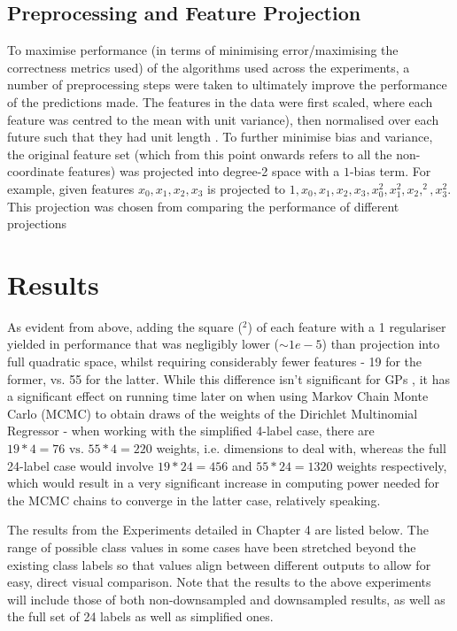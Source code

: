 \subsection{Preprocessing and Feature Projection}
To maximise performance (in terms of minimising error/maximising the correctness metrics used) of the algorithms used across the experiments, a number of preprocessing steps were taken to ultimately improve the performance of the predictions made. The features in the data were first scaled, where each feature was centred to the mean with unit variance), then normalised over each future such that they had unit length . To further minimise bias and variance, the original feature set (which from this point onwards refers to all the non-coordinate features) was projected into degree-2 space with a $1$-bias term. For example, given features $x_0, x_1, x_2, x_3$ is projected to $1, x_0, x_1, x_2, x_3, x_0^2, x_1^2, x_2,^2, x_3^2$. This projection was chosen from comparing the performance of different projections



\section{Results}
As evident from above, adding the square ($^2$) of each feature with a 1 regulariser  yielded in performance that was negligibly lower ($\sim 1e-5$) than projection into full quadratic space, whilst requiring considerably fewer features - 19 for the former, vs. 55 for the latter. While this difference isn't significant for GPs , it has a significant effect on running time later on when using Markov Chain Monte Carlo (MCMC) to obtain draws of the weights of the Dirichlet Multinomial Regressor - when working with the simplified 4-label case, there are $19*4 =76 \text{ vs. } 55*4=220$ weights, i.e. dimensions to deal with, whereas the full 24-label case would involve $19*24=456$ and $55*24=1320$ weights respectively, which would result in a very significant increase in computing power needed for the MCMC chains to converge in the latter case, relatively speaking.

The results from the Experiments detailed in Chapter 4 are listed below. The range of possible class values in some cases have been stretched beyond the existing class labels so that values align between different outputs to allow for easy, direct visual comparison. Note that the results to the above experiments will include those of both non-downsampled and downsampled results, as well as the full set of 24 labels as well as simplified ones.


